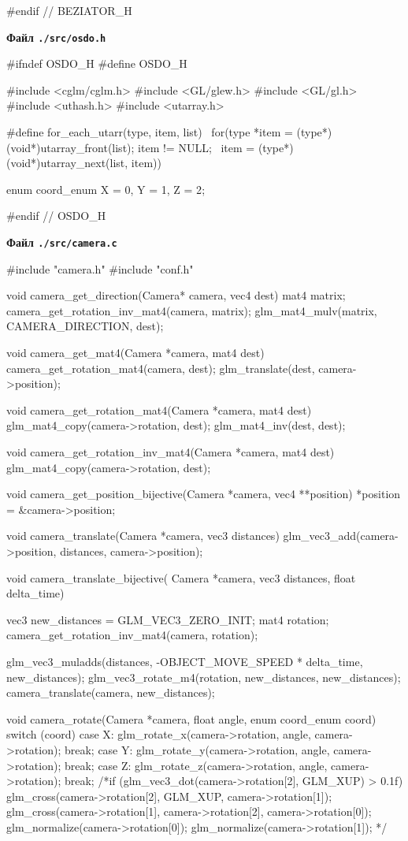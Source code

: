 \documentclass[14pt,a4paper]{extarticle}
\theoremstyle{definition}
\renewcommand{\[}{\begin{singlespace}\begin{equation*}}
\renewcommand{\]}{\end{equation*}\end{singlespace}}
\begin{document}
\begin{multicols}{2}
\begin{ccode}
#endif // BEZIATOR_H
\end{ccode}
\noindent\cprotect\textbf{Файл \verb+./src/osdo.h+}
\begin{ccode}
#ifndef OSDO_H
#define OSDO_H

#include <cglm/cglm.h>
#include <GL/glew.h>
#include <GL/gl.h>
#include <uthash.h>
#include <utarray.h>

#define for_each_utarr(type, item, list) \
    for(type *item = (type*)(void*)utarray_front(list); item != NULL; \
        item = (type*)(void*)utarray_next(list, item))

enum coord_enum {X = 0, Y = 1, Z = 2};

#endif // OSDO_H
\end{ccode}
\noindent\cprotect\textbf{Файл \verb+./src/camera.c+}
\begin{ccode}
#include "camera.h"
#include "conf.h"

void camera_get_direction(Camera* camera, vec4 dest) {
    mat4 matrix;
    camera_get_rotation_inv_mat4(camera, matrix);
    glm_mat4_mulv(matrix, CAMERA_DIRECTION, dest);
}

void camera_get_mat4(Camera *camera, mat4 dest) {
    camera_get_rotation_mat4(camera, dest);
    glm_translate(dest, camera->position);
}

void camera_get_rotation_mat4(Camera *camera, mat4 dest) {
    glm_mat4_copy(camera->rotation, dest);
    glm_mat4_inv(dest, dest);
}

void camera_get_rotation_inv_mat4(Camera *camera, mat4 dest) {
    glm_mat4_copy(camera->rotation, dest);
}

void camera_get_position_bijective(Camera *camera, vec4 **position) {
    *position = &camera->position;
}

void camera_translate(Camera *camera, vec3 distances) {
    glm_vec3_add(camera->position, distances, camera->position);
}

void camera_translate_bijective(
        Camera *camera, vec3 distances, float delta_time) {
    vec3 new_distances = GLM_VEC3_ZERO_INIT;
    mat4 rotation;
    camera_get_rotation_inv_mat4(camera, rotation);

    glm_vec3_muladds(distances, -OBJECT_MOVE_SPEED * delta_time,
                     new_distances);
    glm_vec3_rotate_m4(rotation, new_distances, new_distances);
    camera_translate(camera, new_distances);
}

void camera_rotate(Camera *camera, float angle, enum coord_enum coord) {
    switch (coord) {
    case X: glm_rotate_x(camera->rotation, angle, camera->rotation); break;
    case Y: glm_rotate_y(camera->rotation, angle, camera->rotation); break;
    case Z: glm_rotate_z(camera->rotation, angle, camera->rotation); break;
    }
    /*if (glm_vec3_dot(camera->rotation[2], GLM_XUP) > 0.1f) {
        glm_cross(camera->rotation[2], GLM_XUP, camera->rotation[1]);
        glm_cross(camera->rotation[1], camera->rotation[2], camera->rotation[0]);
        glm_normalize(camera->rotation[0]);
        glm_normalize(camera->rotation[1]);
    }*/
}


\end{ccode}
\end{multicols}
\end{document}
